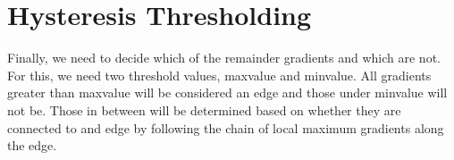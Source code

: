 \documentclass{article}
\begin{document}
\section{Hysteresis Thresholding}
Finally, we need to decide which of the remainder gradients and which are not. For this, we need two threshold values, maxvalue and minvalue. All gradients greater than maxvalue will be considered an edge and those under minvalue will not be. Those in between will be determined based on whether they are connected to and edge by following the chain of local maximum gradients along the edge.
\end{document}
